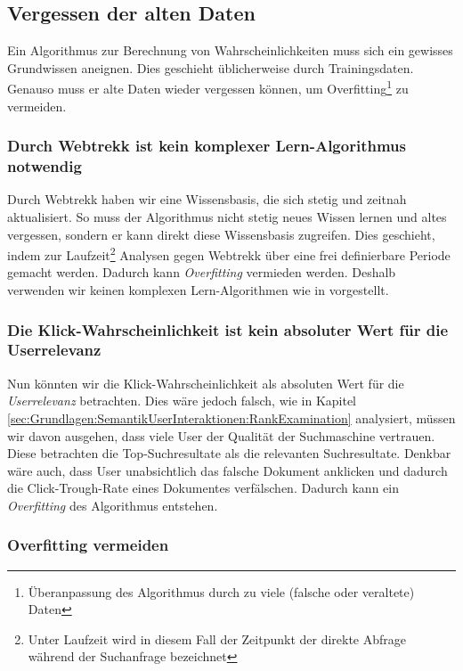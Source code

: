 \subsection{Vergessen der alten Daten}
\label{sec:Reranking:Methodik:Vergessen}

Ein Algorithmus zur Berechnung von Wahrscheinlichkeiten muss sich ein gewisses Grundwissen aneignen. Dies geschieht üblicherweise durch Trainingsdaten. Genauso muss er alte Daten wieder vergessen können, um Overfitting\footnote{Überanpassung des Algorithmus durch zu viele (falsche oder veraltete) Daten} zu vermeiden. 

\subsubsection{Durch Webtrekk ist kein komplexer Lern-Algorithmus notwendig}
\label{sec:Reranking:Methodik:Vergessen:Lern-Algorithmus}

Durch Webtrekk haben wir eine Wissensbasis, die sich stetig und zeitnah aktualisiert. So muss der Algorithmus nicht stetig neues Wissen lernen und altes vergessen, sondern er kann direkt diese Wissensbasis zugreifen. Dies geschieht, indem zur Laufzeit\footnote{Unter Laufzeit wird in diesem Fall der Zeitpunkt der direkte Abfrage während der Suchanfrage bezeichnet} Analysen gegen Webtrekk über eine frei definierbare Periode gemacht werden. Dadurch kann \textit{Overfitting} vermieden werden. Deshalb verwenden wir keinen komplexen Lern-Algorithmen wie in \cite{IWUSBI} vorgestellt.

\subsubsection{Die Klick-Wahrscheinlichkeit ist kein absoluter Wert für die Userrelevanz}
\label{sec:Reranking:Methodik:Vergessen:Relevanzfeedback}

Nun könnten wir die Klick-Wahrscheinlichkeit als absoluten Wert für die \textit{Userrelevanz} betrachten. Dies wäre jedoch falsch, wie in Kapitel \ref{sec:Grundlagen:SemantikUserInteraktionen:RankExamination} analysiert, müssen wir davon ausgehen, dass viele User der Qualität der Suchmaschine vertrauen. Diese betrachten die Top-Suchresultate als die relevanten Suchresultate. Denkbar wäre auch, dass User unabsichtlich das falsche Dokument anklicken und dadurch die Click-Trough-Rate eines Dokumentes verfälschen. Dadurch kann ein \textit{Overfitting} des Algorithmus entstehen.

\subsubsection{Overfitting vermeiden}
\label{sec:Reranking:Methodik:Vergessen:Overfitting}

